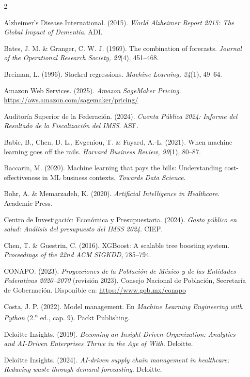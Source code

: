 \documentclass[12pt, letterpaper]{article}
\begin{document}
\begin{multicols}{2}
\small
\setlength{\parindent}{0pt}
\setlength{\hangafter}{1}
\setlength{\parskip}{6pt}
\everypar{\hangindent=1.27cm}

Alzheimer's Disease International. (2015). \textit{World Alzheimer Report 2015: The Global Impact of Dementia}. ADI.

Bates, J. M. \& Granger, C. W. J. (1969). The combination of forecasts. \textit{Journal of the Operational Research Society, 20}(4), 451--468.

Breiman, L. (1996). Stacked regressions. \textit{Machine Learning, 24}(1), 49--64.

Amazon Web Services. (2025). \textit{Amazon SageMaker Pricing}. \url{https://aws.amazon.com/sagemaker/pricing/}

Auditoría Superior de la Federación. (2024). \textit{Cuenta Pública 2024: Informe del Resultado de la Fiscalización del IMSS}. ASF.

Babic, B., Chen, D. L., Evgeniou, T. \& Fayard, A.-L. (2021). When machine learning goes off the rails. \textit{Harvard Business Review, 99}(1), 80--87.

Baccarin, M. (2020). Machine learning that pays the bills: Understanding cost-effectiveness in ML business contexts. \textit{Towards Data Science}.

Bohr, A. \& Memarzadeh, K. (2020). \textit{Artificial Intelligence in Healthcare}. Academic Press.

Centro de Investigación Económica y Presupuestaria. (2024). \textit{Gasto público en salud: Análisis del presupuesto del IMSS 2024}. CIEP.

Chen, T. \& Guestrin, C. (2016). XGBoost: A scalable tree boosting system. \textit{Proceedings of the 22nd ACM SIGKDD}, 785--794.

CONAPO. (2023). \textit{Proyecciones de la Población de México y de las Entidades Federativas 2020--2070} (revisión 2023). Consejo Nacional de Población, Secretaría de Gobernación. Disponible en: \url{https://www.gob.mx/conapo}

Costa, J. P. (2022). Model management. En \textit{Machine Learning Engineering with Python} (2.\textsuperscript{a} ed., cap. 9). Packt Publishing.

Deloitte Insights. (2019). \textit{Becoming an Insight-Driven Organization: Analytics and AI-Driven Enterprises Thrive in the Age of With}. Deloitte.

Deloitte Insights. (2024). \textit{AI-driven supply chain management in healthcare: Reducing waste through demand forecasting}. Deloitte.


\end{multicols}
\end{document}
